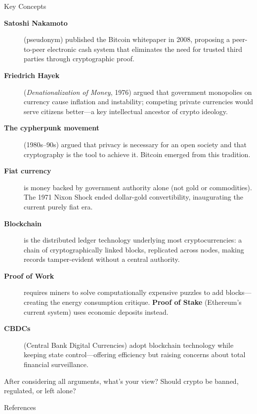 ﻿\documentclass[aspectratio=169,11pt]{beamer}
\begin{document}
\begin{frame}[allowframebreaks]{Key Concepts}
\footnotesize
\begin{description}
    \item[\textbf{Satoshi Nakamoto}] (pseudonym) published the Bitcoin whitepaper in 2008, proposing a peer-to-peer electronic cash system that eliminates the need for trusted third parties through cryptographic proof.
    \item[\textbf{Friedrich Hayek}] (\textit{Denationalization of Money}, 1976) argued that government monopolies on currency cause inflation and instability; competing private currencies would serve citizens better---a key intellectual ancestor of crypto ideology.
    \item[\textbf{The cypherpunk movement}] (1980s--90s) argued that privacy is necessary for an open society and that cryptography is the tool to achieve it. Bitcoin emerged from this tradition.
    \item[\textbf{Fiat currency}] is money backed by government authority alone (not gold or commodities). The 1971 Nixon Shock ended dollar-gold convertibility, inaugurating the current purely fiat era.
    \item[\textbf{Blockchain}] is the distributed ledger technology underlying most cryptocurrencies: a chain of cryptographically linked blocks, replicated across nodes, making records tamper-evident without a central authority.
    \item[\textbf{Proof of Work}] requires miners to solve computationally expensive puzzles to add blocks---creating the energy consumption critique. \textbf{Proof of Stake} (Ethereum's current system) uses economic deposits instead.
    \item[\textbf{CBDCs}] (Central Bank Digital Currencies) adopt blockchain technology while keeping state control---offering efficiency but raising concerns about total financial surveillance.
\end{description}

\begin{discussionbox}[Discussion]
After considering all arguments, what's your view? Should crypto be banned, regulated, or left alone?
\end{discussionbox}
\end{frame}

\begin{frame}[allowframebreaks]{References}
\printbibliography[heading=none]
\end{frame}
\end{document}
